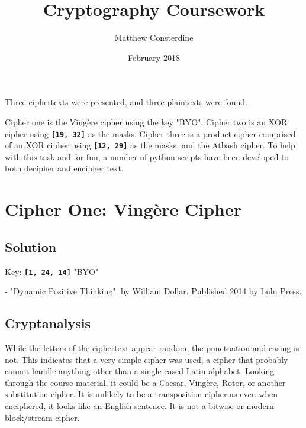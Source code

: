 \documentclass{article}
\title{Cryptography Coursework}
\date{February 2018}
\author{Matthew Consterdine}
\begin{document}
\maketitle

Three ciphertexts were presented, and three plaintexts were found.

Cipher one is the Vingère cipher using the key "BYO". Cipher two is an XOR cipher using \textbf{\lstinline{[19, 32]}} as the masks. Cipher three is a product cipher comprised of an XOR cipher using \textbf{\lstinline{[12, 29]}} as the masks, and the Atbash cipher. To help with this task and for fun, a number of python scripts have been developed to both decipher and encipher text.

\section{Cipher One: Vingère Cipher}

\subsection{Solution}

Key: \textbf{\lstinline{[1, 24, 14]}} "BYO"


- "Dynamic Positive Thinking", by William Dollar. Published 2014 by Lulu Press.

\subsection{Cryptanalysis}

While the letters of the ciphertext appear random, the punctuation and casing is not. This indicates that a very simple cipher was used, a cipher that probably cannot handle anything other than a single cased Latin alphabet. Looking through the course material, it could be a Caesar, Vingère, Rotor, or another substitution cipher. It is unlikely to be a transposition cipher as even when enciphered, it looks like an English sentence. It is not a bitwise or modern block/stream cipher.

\clearpage
\end{document}
